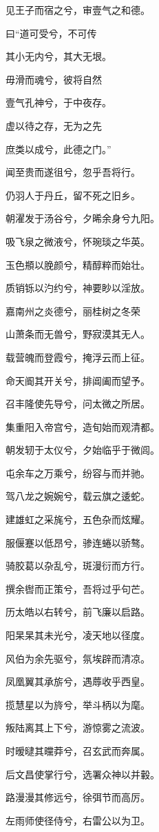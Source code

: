 \documentclass[12pt,a4paper]{ctexbook}
\begin{document}
见王子而宿之兮，审壹气之和德。\par
曰“道可受兮，不可传\par
其小无内兮，其大无垠。\par
毋滑而魂兮，彼将自然\par
壹气孔神兮，于中夜存。\par
虚以待之存，无为之先\par
庶类以成兮，此德之门。”\par
闻至贵而遂徂兮，忽乎吾将行。\par
仍羽人于丹丘，留不死之旧乡。\par
朝濯发于汤谷兮，夕晞余身兮九阳。\par
吸飞泉之微液兮，怀琬琰之华英。\par
玉色頩以脕颜兮，精醇粹而始壮。\par
质销铄以汋约兮，神要眇以淫放。\par
嘉南州之炎德兮，丽桂树之冬荣\par
山萧条而无兽兮，野寂漠其无人。\par
载营魄而登霞兮，掩浮云而上征。\par
命天阍其开关兮，排阊阖而望予。\par
召丰隆使先导兮，问太微之所居。\par
集重阳入帝宫兮，造旬始而观清都。\par
朝发轫于太仪兮，夕始临乎于微闾。\par
屯余车之万乘兮，纷容与而并驰。\par
驾八龙之婉婉兮，载云旗之逶蛇。\par
建雄虹之采旄兮，五色杂而炫耀。\par
服偃蹇以低昂兮，骖连蜷以骄骜。\par
骑胶葛以杂乱兮，斑漫衍而方行。\par
撰余辔而正策兮，吾将过乎句芒。\par
历太皓以右转兮，前飞廉以启路。\par
阳杲杲其未光兮，凌天地以径度。\par
风伯为余先驱兮，氛埃辟而清凉。\par
凤凰翼其承旂兮，遇蓐收乎西皇。\par
揽慧星以为旍兮，举斗柄以为麾。\par
叛陆离其上下兮，游惊雾之流波。\par
时暧曃其曭莽兮，召玄武而奔属。\par
后文昌使掌行兮，选署众神以并轂。\par
路漫漫其修远兮，徐弭节而高厉。\par
左雨师使径侍兮，右雷公以为卫。\par
\end{document}
